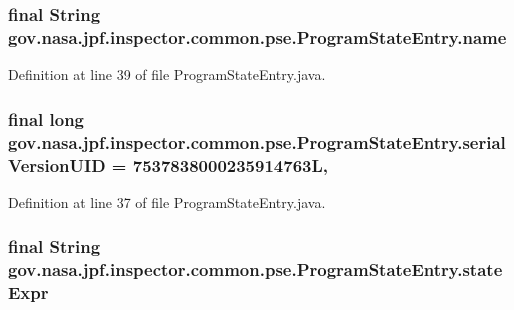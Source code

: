 \subsubsection[{\texorpdfstring{name}{name}}]{\setlength{\rightskip}{0pt plus 5cm}final String gov.\+nasa.\+jpf.\+inspector.\+common.\+pse.\+Program\+State\+Entry.\+name\hspace{0.3cm}{\ttfamily [private]}}\hypertarget{classgov_1_1nasa_1_1jpf_1_1inspector_1_1common_1_1pse_1_1_program_state_entry_a5fbdd37745a66317f1ea7738c3bda2a6}{}\label{classgov_1_1nasa_1_1jpf_1_1inspector_1_1common_1_1pse_1_1_program_state_entry_a5fbdd37745a66317f1ea7738c3bda2a6}


Definition at line 39 of file Program\+State\+Entry.\+java.

\subsubsection[{\texorpdfstring{serial\+Version\+U\+ID}{serialVersionUID}}]{\setlength{\rightskip}{0pt plus 5cm}final long gov.\+nasa.\+jpf.\+inspector.\+common.\+pse.\+Program\+State\+Entry.\+serial\+Version\+U\+ID = 7537838000235914763L\hspace{0.3cm}{\ttfamily [static]}, {\ttfamily [private]}}\hypertarget{classgov_1_1nasa_1_1jpf_1_1inspector_1_1common_1_1pse_1_1_program_state_entry_a8209a0631fc0a9be915a372a69ef1dc2}{}\label{classgov_1_1nasa_1_1jpf_1_1inspector_1_1common_1_1pse_1_1_program_state_entry_a8209a0631fc0a9be915a372a69ef1dc2}


Definition at line 37 of file Program\+State\+Entry.\+java.

\subsubsection[{\texorpdfstring{state\+Expr}{stateExpr}}]{\setlength{\rightskip}{0pt plus 5cm}final String gov.\+nasa.\+jpf.\+inspector.\+common.\+pse.\+Program\+State\+Entry.\+state\+Expr\hspace{0.3cm}{\ttfamily [private]}}\hypertarget{classgov_1_1nasa_1_1jpf_1_1inspector_1_1common_1_1pse_1_1_program_state_entry_a5051697f441f235c01ebcaaf0616555d}{}\label{classgov_1_1nasa_1_1jpf_1_1inspector_1_1common_1_1pse_1_1_program_state_entry_a5051697f441f235c01ebcaaf0616555d}


